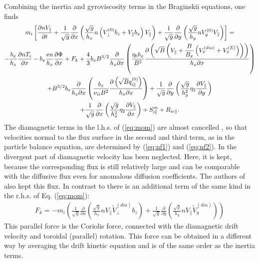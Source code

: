 \documentclass[a4paper,10pt]{report}
\begin{document}
Combining the inertia and gyroviscosity terms in the Braginskii equations,
one finds
\begin{multline}\label{eq:mom}
\hfill m_i \left[ \frac{\partial n V_{\parallel}}{\partial t} +
     \frac{1}{\sqrt{g}} \frac{\partial }{\partial x}
      \left( \frac{\sqrt{g}}{h_x} n
       \left( V_{\perp}^{\left( 0 \right)} b_z
            + V_{\parallel} b_x \right)
       V_{\parallel} \right) +
     \frac{1}{\sqrt{g}} \frac{\partial }{\partial y}
      \left( \frac{\sqrt{g}}{h_y} n V_y^{\left( 0 \right)} V_{\parallel} \right)
\right] = \hfill \\
\hfill -\frac{b_x}{h_x}\frac{\partial n T_i}{\partial x} -
b_x \frac{en}{h_x}\frac{\partial \Phi}{\partial x} + F_k +
\frac{4}{3} b_x B^{3/2} \frac{\partial }{h_x \partial x}
\left(\frac{\eta_0 b_x}{B^2}
\frac{\partial\left(\sqrt{B}\left(V_{\parallel}+ \dfrac{B}{B_x} \left(V^{(dia)}_x + V^{(E)}_x\right)\right)\right)}
{h_x \partial x}\right)
\hfill \\
\hfill + B^{3/2} b_x \frac{\partial}{h_x \partial x}
\left(\frac{b_x}{\nu_{ii} B^2}
\frac{\partial\left(\sqrt{B}q_{i\parallel}^{\left( 0 \right)}
\right)}{h_x \partial x}\right)+
     \frac{1}{\sqrt{g}} \frac{\partial }{\partial y}
      \left(\frac{\sqrt{g}}{h_y^2} \eta_2 \frac{\partial V_{\parallel}}
{\partial y}\right) \hfill \\
\hfill
      + \frac{1}{\sqrt{g}} \frac{\partial }{\partial x}
      \left(\frac{\sqrt{g}}{h_x^2} \eta_2 \frac{\partial V_{\parallel}}
{\partial x}\right)
+ S_{i \parallel}^m + R_{ie\parallel}. \hfill
\end{multline}
The diamagnetic terms in the l.h.s. of (\ref{eq:mom}) are almost cancelled
\cite{ROGNLIEN98A, ROGNLIEN98B, ROGNLIEN99A, HINTON94C}, so that
velocities normal to the flux surface in the second and third term,
as in the particle balance equation, are determined by (\ref{eq:nf1}) and (\ref{eq:nf2}).
In \cite{HINTON94C}
the divergent part of diamagnetic velocity has been
neglected. Here, it is kept, because the corresponding flux is still
relatively large and can be comparable with the diffusive flux even
for anomalous diffusion coefficients. The authors of
\cite{ROGNLIEN98A, ROGNLIEN98B, ROGNLIEN99A} also kept this
flux.
In contrast to
\cite{ROGNLIEN98A, ROGNLIEN98B, ROGNLIEN99A}
there is an additional term of the same kind in the r.h.s. of
Eq. (\ref{eq:mom}):
\begin{gather}
F_k = - m_i \left(\frac{1}{\sqrt{g}} \frac{\partial }{\partial x}
      \left(\frac{\sqrt{g}}{h_x} n V_{\parallel}
      \tilde{V}_{\perp}^{\left( dia \right)} b_z \right) +
      \frac{1}{\sqrt{g}} \frac{\partial }{\partial y}
      \left(\frac{\sqrt{g}}{h_y} n V_{\parallel}
      \tilde{V}_y^{\left( dia \right)} \right)\right)
\end{gather}
This parallel force is the Coriolis force, connected with the
diamagnetic drift velocity and
toroidal (parallel) rotation. This force can be obtained in a different
way by averaging the drift kinetic equation
\cite{MIHAIL84A} and is of the same order
as the inertia terms.
\end{document}
